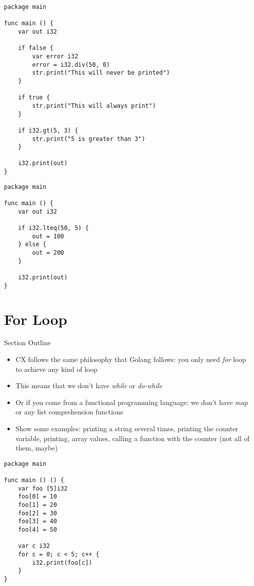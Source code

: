 \documentclass[11pt,fleqn,openany]{book} %
\begin{document}
\begin{lstlisting}[caption={Using If for Control Flow},captionpos=b,label={listing:if-example1}]
package main

func main () {
	var out i32
	
    if false {
		var error i32
		error = i32.div(50, 0)
		str.print("This will never be printed")
	}

	if true {
		str.print("This will always print")
	}

	if i32.gt(5, 3) {
		str.print("5 is greater than 3")
	}
    
	i32.print(out)
}
\end{lstlisting}

\begin{lstlisting}[caption={Using If/Else for Control Flow},captionpos=b,label={listing:if-else-example1}]
package main

func main () {
	var out i32

	if i32.lteq(50, 5) {
		out = 100
	} else {
		out = 200
	}

	i32.print(out)
}
\end{lstlisting}

\section{For Loop}

\begin{remark}
Section Outline
    \begin{itemize}
    \item CX follows the same philosophy that Golang follows: you only need \textit{for} loop to achieve any kind of loop
    \item This means that we don't have \textit{while} or \textit{do-while}
    \item Or if you come from a functional programming language: we don't have \textit{map} or any list comprehension functions
    \item Show some examples: printing a string several times, printing the counter variable, printing, array values, calling a function with the counter (not all of them, maybe)
    \end{itemize}
\end{remark}

\begin{lstlisting}[caption={Array Example},captionpos=b,label={listing:array-example}]
package main

func main () () {
	var foo [5]i32
	foo[0] = 10
	foo[1] = 20
	foo[2] = 30
	foo[3] = 40
	foo[4] = 50

	var c i32
	for c = 0; c < 5; c++ {
		i32.print(foo[c])
	}
}
\end{lstlisting}
\end{document}
